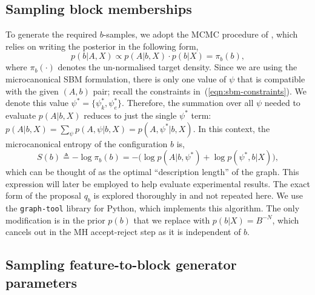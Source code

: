 \subsection{Sampling block memberships}

To generate the required $b$-samples, we adopt the MCMC
procedure of
\cite{Peixoto-MCMC},
which relies on writing the posterior in the following form,
%
\begin{equation}
	p(b | A, X) \propto p(A | b, X) \cdot p(b | X) = \pi_b(b),
\end{equation}
%
where $\pi_b(\cdot)$ denotes the un-normalised target density.
Since we are using the microcanonical SBM formulation, there is only one 
value of $\psi$ that is compatible with the given $(A, b)$ pair;
recall the constraints in~(\ref{eqn:sbm-constraints}).
We denote this value $\psi^* = \{\psi_k^*, \psi_e^*\}$. Therefore, 
the summation over all $\psi$ needed to evaluate $p(A | b, X)$ reduces to just the single $\psi^*$ term:
$p(A | b, X) = \sum_{\psi} \nolimits p(A , \psi | b, X) = p(A, \psi^* | b, X)$.
In
this context, the microcanonical entropy of the configuration $b$
is,
%
\begin{equation}
	S(b) \triangleq - \log \pi_b(b) = - \Big( \log p(A | b, \psi^*) + \log p(\psi^*, b | X) \Big),
	\label{eqn:dl-form}
\end{equation}
%
which can be thought of as the optimal
``description length'' of the graph. 
This expression will later be employed 
to help evaluate experimental results. 
The exact form of the proposal $q_b$ is explored thoroughly in
\cite{Peixoto-MCMC} and not repeated here. We use the \verb*|graph-tool| \cite{peixoto_graph-tool_2014}
library for Python, which implements this algorithm.
The only modification is in 
the prior $p(b)$ that we replace with $p(b|X)=B^{-N}$, 
which cancels out in the MH accept-reject step as it is independent of $b$.

\subsection{Sampling feature-to-block generator parameters}
\label{s:sfb}

